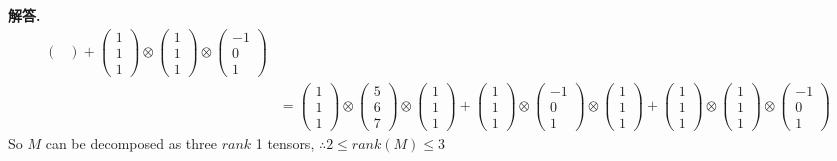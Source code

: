 \documentclass[12pt, a4paper, oneside]{article}
\newenvironment{solution}{\par\noindent\textbf{解答. }}{\par}
\begin{document}
\begin{CJK}{UTF8}{gbsn}
\begin{solution}
\begin{align}
\begin{pmatrix}
    \end{pmatrix} + \begin{pmatrix}
      1 \\ 1 \\ 1
    \end{pmatrix}\otimes\begin{pmatrix}
      1 \\ 1 \\ 1
    \end{pmatrix}\otimes\begin{pmatrix}
      -1 \\ 0 \\ 1
    \end{pmatrix} \nonumber\\
    & =\begin{pmatrix}
      1 \\ 1 \\ 1
    \end{pmatrix}\otimes\begin{pmatrix}
      5 \\ 6 \\ 7
    \end{pmatrix}\otimes\begin{pmatrix}
      1 \\ 1 \\ 1
    \end{pmatrix}+\begin{pmatrix}
      1 \\ 1 \\ 1
    \end{pmatrix}\otimes\begin{pmatrix}
      -1 \\ 0 \\ 1
    \end{pmatrix}\otimes\begin{pmatrix}
      1 \\ 1 \\ 1
    \end{pmatrix}+\begin{pmatrix}
      1 \\ 1 \\ 1
    \end{pmatrix}\otimes\begin{pmatrix}
      1 \\ 1 \\ 1
    \end{pmatrix}\otimes\begin{pmatrix}
      -1 \\ 0 \\ 1
    \end{pmatrix} \nonumber
  \end{align}
  So $M$ can be decomposed as three $rank$ 1 tensors, $\therefore 2\leq rank(M)\leq 3$
\end{solution}



\end{CJK}
\end{document}
